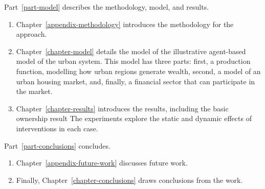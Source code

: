 \noindent Part~\ref{part-model} describes the methodology, model, and results.

\begin{enumerate}
    \item Chapter~\ref{appendix-methodology} introduces the methodology for the approach. 

    \item Chapter~\ref{chapter-model} details the model of the illustrative agent-based model of the urban system. This model has three  parts: first, a production function, modelling how urban regions generate wealth,  second, a model of an urban housing market, and, finally, a financial sector that can participate in the market. 


    \item Chapter~\ref{chapter-results} introduces the results, including the
    basic ownership result %
    The experiments explore the static and dynamic effects of interventions in each case. %
\end{enumerate}

\noindent Part~\ref{part-conclusions} %
concludes. 

\begin{enumerate}
    \item Chapter~\ref{appendix-future-work} discusses future work. 
    \item Finally, Chapter~\ref{chapter-conclusions} draws conclusions from the work.
\end{enumerate}



% 
